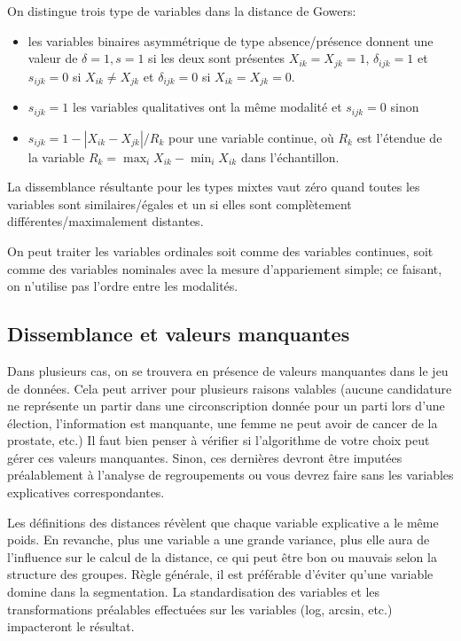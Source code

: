 \documentclass[
  11pt,
  letterpaper,
]{scrbook}
\providecommand{\tightlist}{%
  \setlength{\itemsep}{0pt}\setlength{\parskip}{0pt}}\usepackage{longtable,booktabs,array}
\theoremstyle{definition}
\theoremstyle{remark}
\begin{document}
On distingue trois type de variables dans la distance de Gowers:

\begin{itemize}
\tightlist
\item
  les variables binaires asymmétrique de type absence/présence donnent
  une valeur de \(\delta=1, s=1\) si les deux sont présentes
  \(X_{ik}=X_{jk}=1\), \(\delta_{ijk}=1\) et \(s_{ijk}=0\) si
  \(X_{ik} \neq X_{jk}\) et \(\delta_{ijk}=0\) si \(X_{ik}=X_{jk}=0\).
\item
  \(s_{ijk}=1\) les variables qualitatives ont la même modalité et
  \(s_{ijk}=0\) sinon
\item
  \(s_{ijk} = 1-|X_{ik}-X_{jk}|/R_k\) pour une variable continue, où
  \(R_k\) est l'étendue de la variable
  \(R_k=\max_{i} X_{ik} - \min_i X_{ik}\) dans l'échantillon.
\end{itemize}

La dissemblance résultante pour les types mixtes vaut zéro quand toutes
les variables sont similaires/égales et un si elles sont complètement
différentes/maximalement distantes.

On peut traiter les variables ordinales soit comme des variables
continues, soit comme des variables nominales avec la mesure
d'appariement simple; ce faisant, on n'utilise pas l'ordre entre les
modalités.

\subsection{Dissemblance et valeurs
manquantes}\label{dissemblance-et-valeurs-manquantes}

Dans plusieurs cas, on se trouvera en présence de valeurs manquantes
dans le jeu de données. Cela peut arriver pour plusieurs raisons
valables (aucune candidature ne représente un partir dans une
circonscription donnée pour un parti lors d'une élection, l'information
est manquante, une femme ne peut avoir de cancer de la prostate, etc.)
Il faut bien penser à vérifier si l'algorithme de votre choix peut gérer
ces valeurs manquantes. Sinon, ces dernières devront être imputées
préalablement à l'analyse de regroupements ou vous devrez faire sans les
variables explicatives correspondantes.

Les définitions des distances révèlent que chaque variable explicative a
le même poids. En revanche, plus une variable a une grande variance,
plus elle aura de l'influence sur le calcul de la distance, ce qui peut
être bon ou mauvais selon la structure des groupes. Règle générale, il
est préférable d'éviter qu'une variable domine dans la segmentation. La
standardisation des variables et les transformations préalables
effectuées sur les variables (log, arcsin, etc.) impacteront le
résultat.
\end{document}
